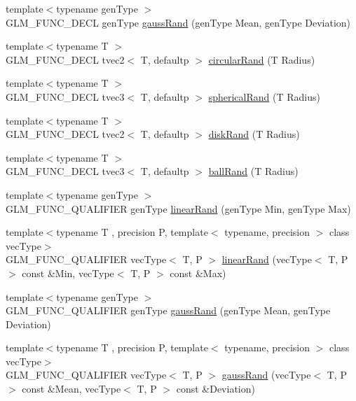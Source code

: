 \begin{DoxyCompactItemize}
\item 
{\footnotesize template$<$typename gen\+Type $>$ }\\G\+L\+M\+\_\+\+F\+U\+N\+C\+\_\+\+D\+E\+C\+L gen\+Type \hyperlink{group__gtc__random_ga5193a83e49e4fdc5652c084711083574}{gauss\+Rand} (gen\+Type Mean, gen\+Type Deviation)
\item 
{\footnotesize template$<$typename T $>$ }\\G\+L\+M\+\_\+\+F\+U\+N\+C\+\_\+\+D\+E\+C\+L tvec2$<$ T, defaultp $>$ \hyperlink{group__gtc__random_gae989c26a2899b2fb7444abe7c275c29c}{circular\+Rand} (T Radius)
\item 
{\footnotesize template$<$typename T $>$ }\\G\+L\+M\+\_\+\+F\+U\+N\+C\+\_\+\+D\+E\+C\+L tvec3$<$ T, defaultp $>$ \hyperlink{group__gtc__random_gaa9a6fc2d7a295b3857f7db23b1053d9d}{spherical\+Rand} (T Radius)
\item 
{\footnotesize template$<$typename T $>$ }\\G\+L\+M\+\_\+\+F\+U\+N\+C\+\_\+\+D\+E\+C\+L tvec2$<$ T, defaultp $>$ \hyperlink{group__gtc__random_gad3a3ee7d26502a31ba552cb627a68606}{disk\+Rand} (T Radius)
\item 
{\footnotesize template$<$typename T $>$ }\\G\+L\+M\+\_\+\+F\+U\+N\+C\+\_\+\+D\+E\+C\+L tvec3$<$ T, defaultp $>$ \hyperlink{group__gtc__random_ga5506dee301160e3a06aef9b9bc7a0a83}{ball\+Rand} (T Radius)
\item 
{\footnotesize template$<$typename gen\+Type $>$ }\\G\+L\+M\+\_\+\+F\+U\+N\+C\+\_\+\+Q\+U\+A\+L\+I\+F\+I\+E\+R gen\+Type \hyperlink{namespaceglm_ad60fbcaa8da896b6f2cdd0aa302b96a4}{linear\+Rand} (gen\+Type Min, gen\+Type Max)
\item 
{\footnotesize template$<$typename T , precision P, template$<$ typename, precision $>$ class vec\+Type$>$ }\\G\+L\+M\+\_\+\+F\+U\+N\+C\+\_\+\+Q\+U\+A\+L\+I\+F\+I\+E\+R vec\+Type$<$ T, P $>$ \hyperlink{group__gtc__random_gaba9cec867916d894d794a32897b7fdfd}{linear\+Rand} (vec\+Type$<$ T, P $>$ const \&Min, vec\+Type$<$ T, P $>$ const \&Max)
\item 
{\footnotesize template$<$typename gen\+Type $>$ }\\G\+L\+M\+\_\+\+F\+U\+N\+C\+\_\+\+Q\+U\+A\+L\+I\+F\+I\+E\+R gen\+Type \hyperlink{group__gtc__random_ga5193a83e49e4fdc5652c084711083574}{gauss\+Rand} (gen\+Type Mean, gen\+Type Deviation)
\item 
{\footnotesize template$<$typename T , precision P, template$<$ typename, precision $>$ class vec\+Type$>$ }\\G\+L\+M\+\_\+\+F\+U\+N\+C\+\_\+\+Q\+U\+A\+L\+I\+F\+I\+E\+R vec\+Type$<$ T, P $>$ \hyperlink{namespaceglm_adc010d4dd74cff264ee912f72de1adb9}{gauss\+Rand} (vec\+Type$<$ T, P $>$ const \&Mean, vec\+Type$<$ T, P $>$ const \&Deviation)

\end{DoxyCompactItemize}
